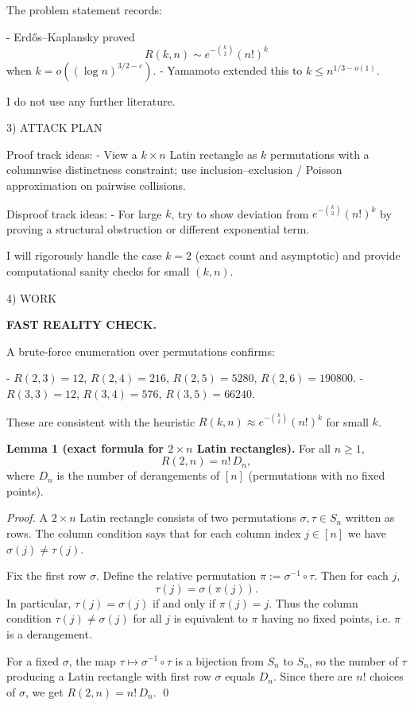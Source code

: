 The problem statement records:

- Erd\H{o}s--Kaplansky proved
  \[R(k,n) \sim e^{-\binom{k}{2}}(n!)^k\]
  when $k=o((\log n)^{3/2-\varepsilon})$.
- Yamamoto extended this to $k\le n^{1/3-o(1)}$.

I do not use any further literature.

3) ATTACK PLAN

Proof track ideas:
- View a $k\times n$ Latin rectangle as $k$ permutations with a columnwise distinctness constraint; use inclusion--exclusion / Poisson approximation on pairwise collisions.

Disproof track ideas:
- For large $k$, try to show deviation from $e^{-\binom{k}{2}}(n!)^k$ by proving a structural obstruction or different exponential term.

I will rigorously handle the case $k=2$ (exact count and asymptotic) and provide computational sanity checks for small $(k,n)$.

4) WORK

\textbf{FAST REALITY CHECK.}

A brute-force enumeration over permutations confirms:

- $R(2,3)=12$, $R(2,4)=216$, $R(2,5)=5280$, $R(2,6)=190800$.
- $R(3,3)=12$, $R(3,4)=576$, $R(3,5)=66240$.

These are consistent with the heuristic $R(k,n)\approx e^{-\binom{k}{2}}(n!)^k$ for small $k$.

\medskip

\textbf{Lemma 1 (exact formula for $2\times n$ Latin rectangles).}
For all $n\ge 1$,
\[
R(2,n) = n!\,D_n,
\]
where $D_n$ is the number of derangements of $[n]$ (permutations with no fixed points).

\emph{Proof.}
A $2\times n$ Latin rectangle consists of two permutations $\sigma,\tau\in S_n$ written as rows.
The column condition says that for each column index $j\in[n]$ we have $\sigma(j)\ne \tau(j)$.

Fix the first row $\sigma$. Define the relative permutation $\pi := \sigma^{-1}\circ\tau$.
Then for each $j$,
\[
\tau(j)=\sigma(\pi(j)).
\]
In particular, $\tau(j)=\sigma(j)$ if and only if $\pi(j)=j$.
Thus the column condition $\tau(j)\ne\sigma(j)$ for all $j$ is equivalent to $\pi$ having no fixed points, i.e. $\pi$ is a derangement.

For a fixed $\sigma$, the map $\tau\mapsto \sigma^{-1}\circ\tau$ is a bijection from $S_n$ to $S_n$, so the number of $\tau$ producing a Latin rectangle with first row $\sigma$ equals $D_n$.
Since there are $n!$ choices of $\sigma$, we get $R(2,n)=n!\,D_n$.
\qed

